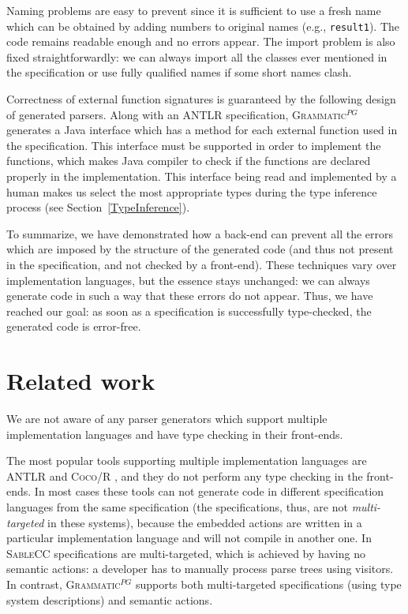 \documentclass{llncs2e/llncs}
\newcommand{\secref}[1]{Section~\ref{#1}}
\newcommand{\tool}[1]{\textsc{#1}}
\newcommand{\ATF}{\textsc{Grammatic}$^{PG}$}
\begin{document}
{Naming problems are easy to prevent since it is sufficient to use a fresh name which can be obtained by adding numbers to original names (e.g., \texttt{result1}). The code remains readable enough and no errors appear.  
The import problem is also fixed straightforwardly: we can always import all the classes ever mentioned in the specification or use fully qualified names if some short names clash.

Correctness of external function signatures is guaranteed by the following design of generated parsers. Along with an \tool{ANTLR} specification, \ATF{} generates a Java interface which has a method for each external function used in the specification. This interface must be supported in order to implement the functions, which makes Java compiler to check if the functions are declared properly in the implementation. This interface being read and implemented by a human makes us select the most appropriate types during the type inference process (see \secref{TypeInference}).

To summarize, we have demonstrated how a back-end can prevent all the errors which are imposed by the structure of the generated code (and thus not present in the specification, and not checked by a front-end). These techniques vary over implementation languages, but the essence stays unchanged: we can always generate code in such a way that these errors do not appear.
Thus, we have reached our goal: as soon as a specification is successfully type-checked, the generated code is error-free.
}

\section{Related work}\label{RelatedWork}

We are not aware of any parser generators which support multiple implementation languages and have type checking in their front-ends.

The most popular tools supporting multiple implementation languages are \tool{ANTLR} \cite{ANTLR} and \tool{Coco/R} \cite{Coco/R}, and they do not perform any type checking in the front-ends. In most cases these tools can not generate code in different specification languages from the same specification (the specifications, thus, are not \emph{multi-targeted} in these systems), because the embedded actions are written in a particular implementation language and will not compile in another one. In \tool{SableCC} \cite{SableCC} specifications are multi-targeted, which is achieved by having no semantic actions: a developer has to manually process parse trees using visitors. In contrast, \ATF{} supports both multi-targeted specifications (using type system descriptions) and semantic actions.
\end{document}
